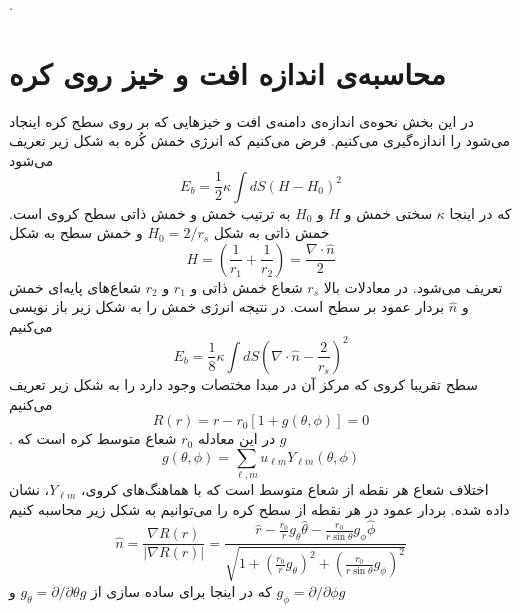 \setRL



.
 
 
 
 
 
\section{محاسبه‌ی اندازه افت و خیز روی کره}
در این بخش نحوه‌ی اندازه‌ی دامنه‌ی افت و خیزهایی که بر روی سطح کره اینجاد می‌شود را اندازه‌گیری می‌کنیم. 
\cite{safran1983}
فرض می‌کنیم که انرژی خمش کُره به شکل زیر تعریف می‌شود
\begin{equation}
E_{b}=\frac{1}{2}\kappa\int dS\left(H-H_0\right)^2
\end{equation}
 که در اینجا 
 $\kappa$
 سختی خمش و
 $H$
و 
$H_0$
به ترتیب خمش و خمش ذاتی سطح کروی است. خمش ذاتی به شکل 
$H_0=2/r_s$
و خمش سطح به شکل
\begin{equation}
H=\left(\frac{1}{r_1}+\frac{1}{r_2}\right)=\frac{\nabla\cdot\hat n}{2}
\end{equation}
تعریف می‌شود. در معادلات بالا 
$r_s$
شعاع خمش ذاتی و 
$r_1$ و $r_2$
شعاع‌های پایه‌ای خمش
و $\hat n$ بردار عمود بر سطح است. در نتیجه انرژی خمش را به شکل زیر باز نویسی می‌کنیم
\begin{equation}
E_{b}=\frac{1}{8}\kappa\int dS\left(\nabla\cdot\hat n-\frac{2}{r_s}\right)^2
\label{eq:ebforsubstitution}
\end{equation}
سطح تقریبا کروی که مرکز آن در مبدا مختصات وجود دارد را به شکل زیر تعریف می‌کنیم
\begin{equation}
R(r)= r-r_0\left[1+g(\theta,\phi)\right]=0
\label{eq:radiusdef}
\end{equation}
. در این معادله $r_0$ شعاع متوسط کره است که $g$
\begin{equation}
g(\theta,\phi)=\sum_{\ell,m}u_{\ell m}Y_{\ell m} (\theta,\phi)
\label{eq:gdef}
\end{equation}
اختلاف شعاع هر نقطه از شعاع متوسط است که با هماهنگ‌های کروی، $Y_{\ell m}$، نشان داده شده. بردار عمود در هر نقطه از سطح کره را می‌توانیم به شکل زیر محاسبه کنیم
\begin{equation}
\hat n = \frac{\nabla R(r)}{|\nabla R(r)|}= \frac{\hat r-\frac{r_0}{r}g_\theta \hat\theta-\frac{r_0}{r\sin\theta}g_\phi\hat\phi }{\sqrt{1+\left(\frac{r_0}{r}g_\theta\right)^2+\left(\frac{r_0}{r\sin\theta}g_\phi\right)^2 }}
\end{equation}
که در اینجا برای ساده سازی از
$g_\theta=\partial/\partial\theta g$
و
$g_\phi=\partial/\partial\phi g$
